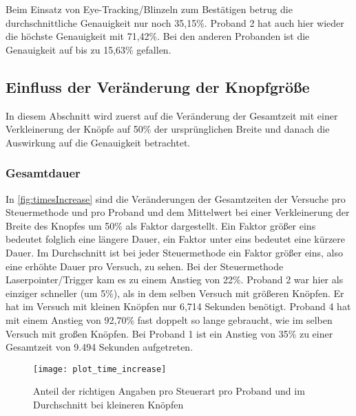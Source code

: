 Beim Einsatz von Eye-Tracking/Blinzeln zum Bestätigen betrug die durchschnittliche Genauigkeit nur noch 35,15\%. Proband 2 hat auch hier wieder die höchste Genauigkeit mit 71,42\%. Bei den anderen Probanden ist die Genauigkeit auf bis zu 15,63\% gefallen. 



\subsection{Einfluss der Veränderung der Knopfgröße}
\label{section:influencebuttonsize}
In diesem Abschnitt wird zuerst auf die Veränderung der Gesamtzeit mit einer Verkleinerung der Knöpfe auf 50\% der ursprünglichen Breite und danach die Auswirkung auf die Genauigkeit betrachtet. 
\subsubsection{Gesamtdauer}
In \autoref{fig:timesIncrease} sind die Veränderungen der Gesamtzeiten der Versuche pro Steuermethode und pro Proband und dem Mittelwert bei einer Verkleinerung der Breite des Knopfes um 50\% als Faktor dargestellt. Ein Faktor größer eins bedeutet folglich eine längere Dauer, ein Faktor unter eins bedeutet eine kürzere Dauer. Im Durchschnitt ist bei jeder Steuermethode ein Faktor größer eins, also eine erhöhte Dauer pro Versuch, zu sehen. Bei der Steuermethode Laserpointer/Trigger kam es zu einem Anstieg von 22\%. Proband 2 war hier als einziger schneller (um 5\%), als in dem selben Versuch mit größeren Knöpfen. Er hat im Versuch mit kleinen Knöpfen nur 6,714 Sekunden benötigt. Proband 4 hat mit einem Anstieg von 92,70\% fast doppelt so lange gebraucht, wie im selben Versuch mit großen Knöpfen. Bei Proband 1 ist ein Anstieg von 35\% zu einer Gesamtzeit von 9.494 Sekunden aufgetreten.

\begin{figure}[!htbp]
	\centering
	\texttt{[image: plot\_time\_increase]}
	\caption[Anteil der richtigen Angaben pro Steuerart pro Proband und im Durchschnitt bei kleineren Knöpfen]{Anteil der richtigen Angaben pro Steuerart pro Proband und im Durchschnitt bei kleineren Knöpfen}
	\label{fig:timesIncrease}
\end{figure}

